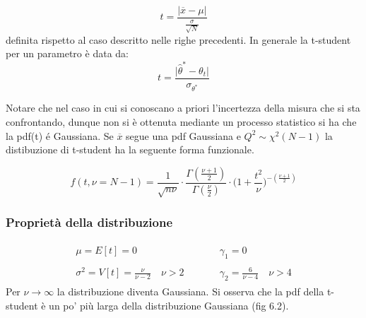  \begin{equation*}
 	t = \dfrac{\vert \overline{x} - \mu\vert }{\frac{\sigma}{\sqrt{N}}}
 \end{equation*}
 definita rispetto al caso descritto nelle righe precedenti. In generale la t-student per un parametro \`{e} data da:
 \begin{equation}
 	t = \dfrac{\vert \hat{\theta}^* - \theta_t \vert}{\sigma_{\theta^*}}
 \end{equation}
 
 Notare che nel caso in cui si conoscano a priori l'incertezza della misura che si sta confrontando, dunque non si \`{e} ottenuta mediante un processo statistico si ha che la pdf(t) \'{e} Gaussiana.
 Se $\overline{x}$ segue una pdf Gaussiana e $Q^2 \sim \chi^2(N-1)$ la distibuzione di t-student ha la seguente forma funzionale.
 
 \begin{equation}
 	f(t,\nu = N-1) = \dfrac{1}{\sqrt{n\nu}} \cdot \dfrac{\Gamma({\frac{\nu+1}{2}})}{\Gamma(\frac{\nu}{2})} \cdot \Big (1 + \frac{t^2}{\nu} \Big) ^{-(\frac{\nu+1}{2})}
 \end{equation}
 
 \subsubsection{Propriet\`{a} della distribuzione}
 \begin{align*}
 	\begin{matrix}
 		\mu = E[t] = 0 & \quad \quad & \gamma_1 = 0 \\
 		\\
 		\sigma^2 = V[t] = \frac{\nu}{\nu-2} \quad \nu > 2 & \quad \quad & \gamma_2 = \frac{6}{\nu-4} \quad \nu > 4
 	\end{matrix}	
 \end{align*}
 \newline
 Per $\nu \rightarrow \infty$ la distribuzione diventa Gaussiana. Si osserva che la pdf della t-student \`{e} un po' pi\`{u} larga della distribuzione Gaussiana (fig 6.2).
 
